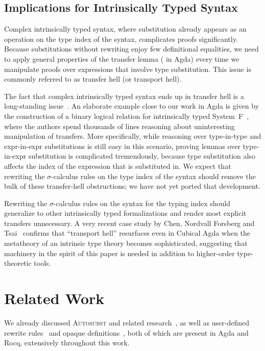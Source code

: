 \documentclass[a4paper,UKenglish,cleveref, autoref, thm-restate,anonymous]{lipics-v2021}
\begin{document}
\subsection{Implications for Intrinsically Typed Syntax}
Complex intrinsically typed syntax, where substitution already appears as an
operation on the type index of the syntax, complicates proofs significantly.
Because substitutions without rewriting enjoy few definitional equalities, we
need to apply general properties of the transfer lemma (
in Agda) every time we manipulate proofs over expressions that involve type
substitution. This issue is commonly referred to as transfer hell (or
transport hell).

The fact that complex intrinsically typed syntax ends up in transfer hell is a
long-standing issue~\cite{article}. An elaborate example close to our work in
Agda is given by the construction of a binary logical relation for
intrinsically typed System~F~\cite{10.1145/3678000.3678201}, where the
authors spend thousands of lines reasoning about uninteresting manipulation
of transfers. More specifically, while reasoning over type-in-type and
expr-in-expr substitutions is still easy in this scenario, proving lemmas
over type-in-expr substitution is complicated tremendously, because type
substitution also affects the index of the expression that is substituted in.
We expect that rewriting the $σ$-calculus rules on the type index of the
syntax should remove the bulk of these transfer-hell obstructions; we have
not yet ported that development.

Rewriting the $σ$-calculus rules on the syntax for the typing index should
generalize to other intrinsically typed formalizations and render most
explicit transfers unnecessary. A very recent case study by Chen, Nordvall
Forsberg and Tsai~\cite{10.1145/3779031.3779090} confirms that ``transport
hell'' resurfaces even in Cubical Agda when the metatheory of an intrinsic
type theory becomes sophisticated, suggesting that machinery in the spirit of
this paper is needed in addition to higher-order type-theoretic tools.

\section{Related Work}\label{sec:rwk}
We already discussed \textsc{Autosubst} and related
research~\cite{10.1145/3293880.3294101, schafer2015autosubst,
      Stark:2020:Mechanising}, as well as user-defined rewrite
rules~\cite{10.1145/3434341, cockx:LIPIcs.TYPES.2019.2,
      leray_et_al:LIPIcs.ITP.2024.26} and opaque
definitions~\cite{gratzer2022controlling}, both of which are present in Agda
and Rocq, extensively throughout this work.
\end{document}
